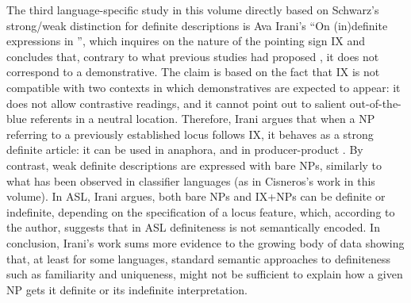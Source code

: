 \documentclass[output=paper]{langsci/langscibook}
\begin{document}
The third language-specific study in this volume directly based on Schwarz’s strong/weak distinction for definite descriptions is Ava Irani’s “On (in)definite expressions in ”, which inquires on the nature of the pointing sign IX and concludes that, contrary to what previous studies had proposed \citep{KoulidobrovaLilloMartin2016}, it does not correspond to a demonstrative. The claim is based on the fact that IX is not compatible with two contexts in which demonstratives are expected to appear: it does not allow contrastive readings, and it cannot point out to salient out-of-the-blue referents in a neutral location. Therefore, Irani argues that when a NP referring to a previously established locus follows IX, it behaves as a strong definite article: it can be used in anaphora, and in producer-product . By contrast, weak definite descriptions are expressed with bare NPs, similarly to what has been observed in classifier languages (as in Cisneros’s work in this volume). In ASL, Irani argues, both bare NPs and IX+NPs can be definite or indefinite, depending on the specification of a locus feature, which, according to the author, suggests that in ASL definiteness is not semantically encoded. In conclusion, Irani’s work sums more evidence to the growing body of data showing that, at least for some languages, standard semantic approaches to definiteness such as familiarity and uniqueness, might not be sufficient to explain how a given NP gets it definite or its indefinite interpretation. 
\end{document}
